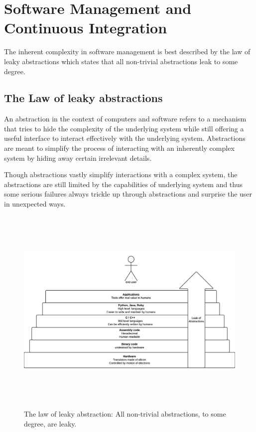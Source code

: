 \documentclass[12pt,conference]{IEEEtran}
\begin{document}
\section*{Software Management and Continuous Integration}

The inherent complexity in software management is best described by the law of leaky abstractions \cite{spolsky_law_2002} which states that all non-trivial abstractions leak to some degree. 

\subsection*{The Law of leaky abstractions}

An abstraction in the context of computers and software refers to a mechanism that tries to hide the complexity of the underlying system while still offering a useful interface to interact effectively with the underlying system. Abstractions are meant to simplify the process of interacting with an inherently complex system by hiding away certain irrelevant details.

Though abstractions vastly simplify interactions with a complex system, the abstractions are still limited by the capabilities of underlying system and  thus some serious failures always trickle up through abstractions and surprise the user in unexpected ways.

\begin{figure}
  \centering
  \includegraphics[height=4in]{leakyabstraction}
  \caption{The law of leaky abstraction: All non-trivial abstractions, to some degree, are leaky.}
  \label{leakyabstraction}
\end{figure}
\end{document}
